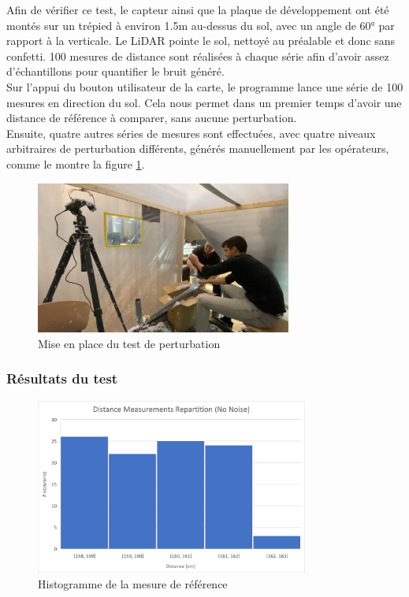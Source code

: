 Afin de vérifier ce test, le capteur ainsi que la plaque de développement ont été montés sur un trépied
à environ 1.5m au-dessus du sol, avec un angle de 60° par rapport à la verticale. Le LiDAR pointe le sol,
nettoyé au préalable et donc sans confetti. 100 mesures de distance sont réalisées à chaque série afin
d'avoir assez d'échantillons pour quantifier le bruit généré.\\
Sur l'appui du bouton utilisateur de la carte, le programme lance une série de 100 mesures en direction
du sol. Cela nous permet dans un premier temps d'avoir une distance de référence à comparer, sans aucune
perturbation. \\
Ensuite, quatre autres séries de mesures sont effectuées, avec quatre niveaux arbitraires de perturbation
différents, générés manuellement par les opérateurs, comme le montre la figure \ref{ErrorMesSetup}.

\begin{figure}[H]
    \centering
    \includegraphics[width=0.75\textwidth]{Images/LiDAR/ErrorMesSetup.jpeg}
    \caption{Mise en place du test de perturbation}
    \label{ErrorMesSetup}
\end{figure}

\subsubsection{Résultats du test}

\begin{figure}[H]
    \centering
    \includegraphics[width=0.8\textwidth]{Images/LiDAR/LiDAR_ErrorMes_NoNoise.png}
    \caption{Histogramme de la mesure de référence}
    \label{ErrorMesRefDist}
\end{figure}

